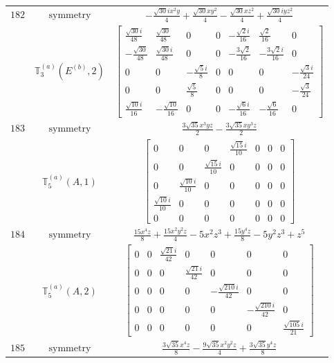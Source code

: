 \documentclass[fleqn,8pt,landscape]{jsarticle}
\begin{document}
\begin{longtable}{ccc}
$ 182 $ & $ \text{symmetry} $ & $ - \frac{\sqrt{30} i x^{2} y}{4} + \frac{\sqrt{30} x y^{2}}{4} - \frac{\sqrt{30} x z^{2}}{4} + \frac{\sqrt{30} i y z^{2}}{4} $ \\
$  $ & $ \mathbb{T}_{3}^{(a)}(E^{(b)},2) $ & $ \begin{bmatrix} \frac{\sqrt{30} i}{48} & \frac{\sqrt{30}}{48} & 0 & 0 & - \frac{\sqrt{2} i}{16} & \frac{\sqrt{2}}{16} & 0 \\ - \frac{\sqrt{30}}{48} & \frac{\sqrt{30} i}{48} & 0 & 0 & - \frac{3 \sqrt{2}}{16} & - \frac{3 \sqrt{2} i}{16} & 0 \\ 0 & 0 & - \frac{\sqrt{5} i}{8} & 0 & 0 & 0 & - \frac{\sqrt{3} i}{24} \\ 0 & 0 & \frac{\sqrt{5}}{8} & 0 & 0 & 0 & - \frac{\sqrt{3}}{24} \\ \frac{\sqrt{10} i}{16} & - \frac{\sqrt{10}}{16} & 0 & 0 & - \frac{\sqrt{6} i}{16} & - \frac{\sqrt{6}}{16} & 0 \end{bmatrix} $ \\ \hline
$ 183 $ & $ \text{symmetry} $ & $ \frac{3 \sqrt{35} x^{3} y z}{2} - \frac{3 \sqrt{35} x y^{3} z}{2} $ \\
$  $ & $ \mathbb{T}_{5}^{(a)}(A,1) $ & $ \begin{bmatrix} 0 & 0 & 0 & \frac{\sqrt{15} i}{10} & 0 & 0 & 0 \\ 0 & 0 & \frac{\sqrt{15} i}{10} & 0 & 0 & 0 & 0 \\ 0 & \frac{\sqrt{10} i}{10} & 0 & 0 & 0 & 0 & 0 \\ \frac{\sqrt{10} i}{10} & 0 & 0 & 0 & 0 & 0 & 0 \\ 0 & 0 & 0 & 0 & 0 & 0 & 0 \end{bmatrix} $ \\ \hline
$ 184 $ & $ \text{symmetry} $ & $ \frac{15 x^{4} z}{8} + \frac{15 x^{2} y^{2} z}{4} - 5 x^{2} z^{3} + \frac{15 y^{4} z}{8} - 5 y^{2} z^{3} + z^{5} $ \\
$  $ & $ \mathbb{T}_{5}^{(a)}(A,2) $ & $ \begin{bmatrix} 0 & 0 & \frac{\sqrt{21} i}{42} & 0 & 0 & 0 & 0 \\ 0 & 0 & 0 & \frac{\sqrt{21} i}{42} & 0 & 0 & 0 \\ 0 & 0 & 0 & 0 & - \frac{\sqrt{210} i}{42} & 0 & 0 \\ 0 & 0 & 0 & 0 & 0 & - \frac{\sqrt{210} i}{42} & 0 \\ 0 & 0 & 0 & 0 & 0 & 0 & \frac{\sqrt{105} i}{21} \end{bmatrix} $ \\ \hline
$ 185 $ & $ \text{symmetry} $ & $ \frac{3 \sqrt{35} x^{4} z}{8} - \frac{9 \sqrt{35} x^{2} y^{2} z}{4} + \frac{3 \sqrt{35} y^{4} z}{8} $ \\

\end{longtable}
\end{document}
